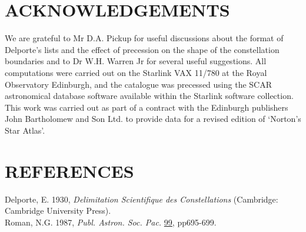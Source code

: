 \section{ACKNOWLEDGEMENTS}

We are grateful to Mr D.A. Pickup for useful discussions about the format of
Delporte's lists and the effect of precession on the shape of the constellation
boundaries and to Dr W.H. Warren Jr for several useful suggestions. All
computations were carried out on the Starlink VAX 11/780 at the Royal
Observatory Edinburgh, and the catalogue was precessed using the SCAR
astronomical database software available within the Starlink software
collection. This work was carried out as part of a contract with the Edinburgh
publishers John Bartholomew and Son Ltd. to provide data for a revised edition
of `Norton's Star Atlas'.

\section{REFERENCES}

Delporte, E. 1930, {\it Delimitation Scientifique des Constellations}
(Cambridge: Cambridge University Press).
\\[2.0ex]
Roman, N.G. 1987, {\it Publ. Astron. Soc. Pac.} \underline{99},
pp695-699.

%
%

